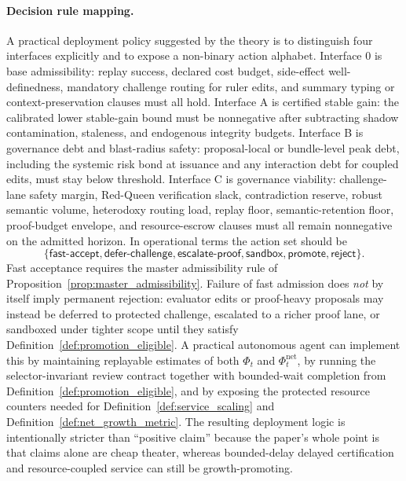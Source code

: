 \documentclass[11pt]{article}
\theoremstyle{definition}
\newcommand{\1}{\mathbf{1}}
\begin{document}
\paragraph{Decision rule mapping.} A practical deployment policy suggested by the theory is to distinguish four interfaces explicitly and to expose a non-binary action alphabet. Interface 0 is base admissibility: replay success, declared cost budget, side-effect well-definedness, mandatory challenge routing for ruler edits, and summary typing or context-preservation clauses must all hold. Interface A is certified stable gain: the calibrated lower stable-gain bound must be nonnegative after subtracting shadow contamination, staleness, and endogenous integrity budgets. Interface B is governance debt and blast-radius safety: proposal-local or bundle-level peak debt, including the systemic risk bond at issuance and any interaction debt for coupled edits, must stay below threshold. Interface C is governance viability: challenge-lane safety margin, Red-Queen verification slack, contradiction reserve, robust semantic volume, heterodoxy routing load, replay floor, semantic-retention floor, proof-budget envelope, and resource-escrow clauses must all remain nonnegative on the admitted horizon. In operational terms the action set should be
\[
\{\textsf{fast-accept},\textsf{defer-challenge},\textsf{escalate-proof},\textsf{sandbox},\textsf{promote},\textsf{reject}\}.
\]
Fast acceptance requires the master admissibility rule of Proposition~\ref{prop:master_admissibility}. Failure of fast admission does \emph{not} by itself imply permanent rejection: evaluator edits or proof-heavy proposals may instead be deferred to protected challenge, escalated to a richer proof lane, or sandboxed under tighter scope until they satisfy Definition~\ref{def:promotion_eligible}. A practical autonomous agent can implement this by maintaining replayable estimates of both $\Phi_t$ and $\Phi_t^{\mathrm{net}}$, by running the selector-invariant review contract together with bounded-wait completion from Definition~\ref{def:promotion_eligible}, and by exposing the protected resource counters needed for Definition~\ref{def:service_scaling} and Definition~\ref{def:net_growth_metric}. The resulting deployment logic is intentionally stricter than ``positive claim'' because the paper's whole point is that claims alone are cheap theater, whereas bounded-delay delayed certification and resource-coupled service can still be growth-promoting.
\end{document}
